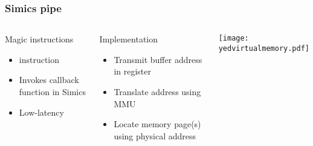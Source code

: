 \begin{frame}
\frametitle{Simics pipe}

\begin{columns}

  \begin{block}{Magic instructions}
    \begin{itemize}
    \item {} instruction
    \item Invokes callback function in Simics
    \item Low-latency
    \end{itemize}
  \end{block}

  \begin{block}{Implementation}
    \begin{itemize}
    \item Transmit buffer address in register
    \item Translate address using MMU
    \item Locate memory page(s) using physical address
    \end{itemize}
  \end{block}
  
  \begin{center}
    \texttt{[image: yedvirtualmemory.pdf]}
  \end{center}
\end{columns}

\end{frame}

